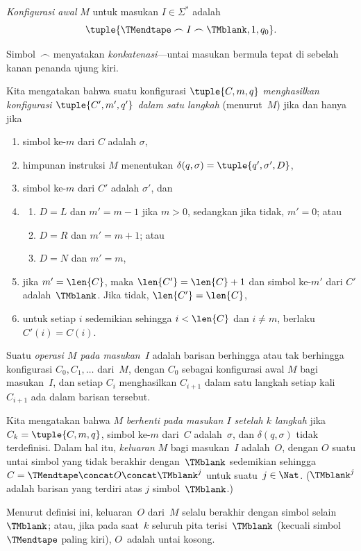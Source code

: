 \documentclass[../../../include/open-logic-section]{subfiles}
\begin{document}
\begin{defn}
\emph{Konfigurasi awal} $M$ untuk masukan $I \in \Sigma^*$ adalah
\[
\tuple{\TMendtape \frown I \frown \TMblank, 1, q_0}.
\]
\end{defn}

\begin{explain}
Simbol~$\frown$ menyatakan \emph{konkatenasi}---untai masukan bermula tepat di
sebelah kanan penanda ujung kiri.
\end{explain}

\begin{defn}
Kita mengatakan bahwa suatu konfigurasi $\tuple{C, m, q}$ \emph{menghasilkan
konfigurasi $\tuple{C', m', q'}$ dalam satu langkah} (menurut~$M$) jika dan
hanya jika
\begin{enumerate}
\item simbol ke-$m$ dari $C$ adalah $\sigma$,
\item himpunan instruksi $M$ menentukan $\delta(q, \sigma) =
  \tuple{q', \sigma', D}$,
\item simbol ke-$m$ dari $C'$ adalah $\sigma'$, dan
\item
\begin{enumerate}
\item $D = L$ dan $m' = m - 1$ jika $m>0$, sedangkan jika tidak, $m'=0$; atau
\item $D = R$ dan $m' = m + 1$; atau
\item $D = N$ dan $m' = m$,
\end{enumerate}
\item jika $m' = \len{C}$, maka $\len{C'} = \len{C} + 1$ dan simbol ke-$m'$
  dari $C'$ adalah~$\TMblank$. Jika tidak, $\len{C'}=\len{C}$,
\item untuk setiap $i$ sedemikian sehingga $i < \len{C}$ dan $i \neq m$,
  berlaku $C'(i) = C(i)$.
\end{enumerate}
\end{defn}

\begin{defn}
Suatu \emph{operasi $M$ pada masukan~$I$} adalah barisan berhingga atau tak
berhingga konfigurasi $C_0,C_1,\dots$ dari~$M$, dengan $C_0$ sebagai
konfigurasi awal $M$ bagi masukan~$I$, dan setiap $C_i$ menghasilkan
$C_{i+1}$ dalam satu langkah setiap kali $C_{i+1}$ ada dalam barisan tersebut.

Kita mengatakan bahwa $M$ \emph{berhenti pada masukan $I$ setelah $k$ langkah}
jika $C_k = \tuple{C, m, q}$, simbol ke-$m$ dari~$C$ adalah~$\sigma$, dan
$\delta(q, \sigma)$ tidak terdefinisi. Dalam hal itu, \emph{keluaran} $M$ bagi
masukan~$I$ adalah~$O$, dengan $O$ suatu untai simbol yang tidak berakhir
dengan~$\TMblank$ sedemikian sehingga
$C = \TMendtape \concat O \concat \TMblank^j$ untuk suatu~$j \in \Nat$.
($\TMblank^j$ adalah barisan yang terdiri atas $j$ simbol~$\TMblank$.)
\end{defn}

\begin{explain}
Menurut definisi ini, keluaran~$O$ dari~$M$ selalu berakhir dengan simbol selain
$\TMblank$; atau, jika pada saat~$k$ seluruh pita terisi~$\TMblank$ (kecuali
simbol~$\TMendtape$ paling kiri), $O$~adalah untai kosong.
\end{explain}
\end{document}
